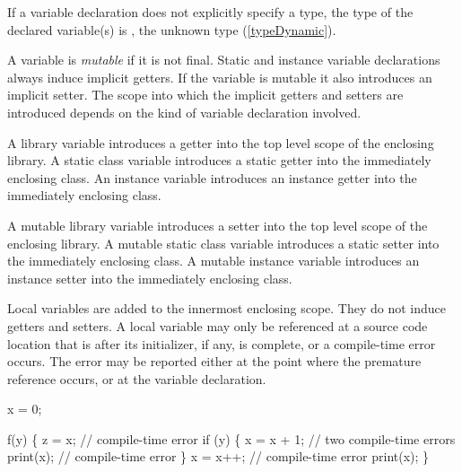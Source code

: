 \documentclass{article}
\begin{document}
\LMHash{}
If a variable declaration does not explicitly specify a type, the type of the declared variable(s) is \DYNAMIC{}, the unknown type (\ref{typeDynamic}).

\LMHash{}
A variable is {\em mutable} if it is not final.
Static and instance variable declarations always induce implicit getters.
If the variable is mutable it also introduces an implicit setter.
The scope into which the implicit getters and setters are introduced depends on the kind of variable declaration involved.

\LMHash{}
A library variable introduces a getter into the top level scope of the enclosing library.
A static class variable introduces a static getter into the immediately enclosing class.
An instance variable introduces an instance getter into the immediately enclosing class.

\LMHash{}
A mutable library variable introduces a setter into the top level scope of the enclosing library.
A mutable static class variable introduces a static setter into the immediately enclosing class.
A mutable instance variable introduces an instance setter into the immediately enclosing class.

\LMHash{}
Local variables are added to the innermost enclosing scope.
They do not induce getters and setters.
A local variable may only be referenced at a source code location that is after its initializer, if any, is complete, or a compile-time error occurs.
The error may be reported either at the point where the premature reference occurs, or at the variable declaration.



\begin{dartCode}
\VAR{} x = 0;

f(y) \{
  \VAR{} z = x; // compile-time error
  if (y) \{
    x = x + 1; // two compile-time errors
    print(x); // compile-time error
  \}
  \VAR{} x = x++; // compile-time error
  print(x);
\}
\end{dartCode}

\end{document}

